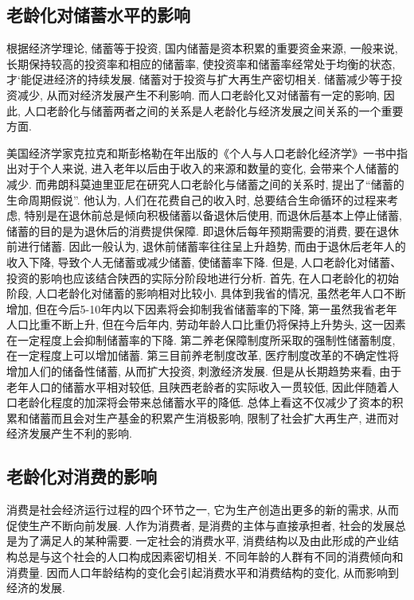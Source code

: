 \documentclass[a4paper, 12pt, UTF8]{article}
\begin{document}
\subsection{老龄化对储蓄水平的影响}
根据经济学理论, 储蓄等于投资, 国内储蓄是资本积累的重要资金来源, 一般来说, 长期保持较高的投资率和相应的储蓄率, 使投资率和储蓄率经常处于均衡的状态, 才`能促进经济的持续发展. 储蓄对于投资与扩大再生产密切相关. 储蓄减少等于投资减少, 从而对经济发展产生不利影响. 而人口老龄化又对储蓄有一定的影响, 因此, 人口老龄化与储蓄两者之间的关系是人老龄化与经济发展之间关系的一个重要方面. 

美国经济学家克拉克和斯彭格勒在年出版的《个人与人口老龄化经济学》一书中指出对于个人来说, 进入老年以后由于收入的来源和数量的变化, 会带来个人储蓄的减少. 而弗朗科莫迪里亚尼在研究人口老龄化与储蓄之间的关系时, 提出了``储蓄的生命周期假说''. 他认为, 人们在花费自己的收入时, 总要结合生命循环的过程来考虑, 特别是在退休前总是倾向积极储蓄以备退休后使用, 而退休后基本上停止储蓄, 储蓄的目的是为退休后的消费提供保障. 即退休后每年预期需要的消费, 要在退休前进行储蓄. 因此一般认为, 退休前储蓄率往往呈上升趋势, 而由于退休后老年人的收入下降, 导致个人无储蓄或减少储蓄, 使储蓄率下降. 但是, 人口老龄化对储蓄、投资的影响也应该结合陕西的实际分阶段地进行分析. 首先, 在人口老龄化的初始阶段, 人口老龄化对储蓄的影响相对比较小. 具体到我省的情况, 虽然老年人口不断增加, 但在今后5-10年内以下因素将会抑制我省储蓄率的下降, 第一虽然我省老年人口比重不断上升, 但在今后年内, 劳动年龄人口比重仍将保持上升势头, 这一因素在一定程度上会抑制储蓄率的下降. 第二养老保障制度所采取的强制性储蓄制度, 在一定程度上可以增加储蓄. 第三目前养老制度改革, 医疗制度改革的不确定性将增加人们的储备性储蓄, 从而扩大投资, 刺激经济发展. 但是从长期趋势来看, 由于老年人口的储蓄水平相对较低, 且陕西老龄者的实际收入一贯较低, 因此伴随着人口老龄化程度的加深将会带来总储蓄水平的降低. 总体上看这不仅减少了资本的积累和储蓄而且会对生产基金的积累产生消极影响, 限制了社会扩大再生产, 进而对经济发展产生不利的影响. 

\subsection{老龄化对消费的影响}
消费是社会经济运行过程的四个环节之一, 它为生产创造出更多的新的需求, 从而促使生产不断向前发展. 人作为消费者, 是消费的主体与直接承担者, 社会的发展总是为了满足人的某种需要. 一定社会的消费水平, 消费结构以及由此形成的产业结构总是与这个社会的人口构成因素密切相关. 不同年龄的人群有不同的消费倾向和消费量. 因而人口年龄结构的变化会引起消费水平和消费结构的变化, 从而影响到经济的发展. 
\end{document}
